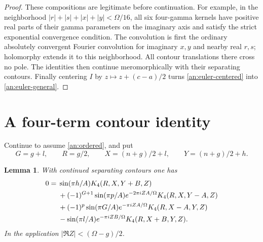 \documentclass[11pt]{article}
\numberwithin{equation}{section}
\newtheorem{lemma}[theorem]{Lemma}
\theoremstyle{definition}
\theoremstyle{remark}
\begin{document}
\begin{proof}
These compositions are legitimate before continuation.  For example,
in the neighborhood $|r|+|s|+|x|+|y|<\Omega/16$, all six
four-gamma kernels have positive real parts of their gamma parameters
on the imaginary axis and satisfy the strict exponential convergence
condition.  The convolution is first the ordinary absolutely
convergent Fourier convolution for imaginary $x,y$ and nearby real
$r,s$; holomorphy extends it to this neighborhood.  All contour
translations there cross no pole.  The identities then continue
meromorphically with their separating contours.  Finally centering
$I$ by $z\mapsto z+(c-a)/2$ turns \eqref{an:euler-centered} into
\eqref{an:euler-general}.
\end{proof}

\section{A four-term contour identity}
\label{an:four-term-section}

Continue to assume \eqref{an:ordered}, and put
\[
 G=g+l,\qquad R=g/2,\qquad
 X=(n+g)/2+l,\qquad Y=(n+g)/2+h.
\]
\begin{lemma}\label{an:four-term}
With continued separating contours one has
\begin{align}
0={}&\sin(\pi h/A)K_4(R,X,Y+B,Z)\notag\\
 &+(-1)^{G+1}\sin(\pi p/A)e^{-2\pi iZA/\Omega}
                                     K_4(R,X,Y-A,Z)\notag\\
 &+(-1)^p\sin(\pi G/A)e^{-\pi iZA/\Omega}
                                     K_4(R,X-A,Y,Z)\notag\\
 &-\sin(\pi l/A)e^{-\pi iZB/\Omega}K_4(R,X+B,Y,Z).
 \label{an:four-term-eq}
\end{align}
In the application $|\Re Z|<(\Omega-g)/2$.
\end{lemma}
\end{document}
